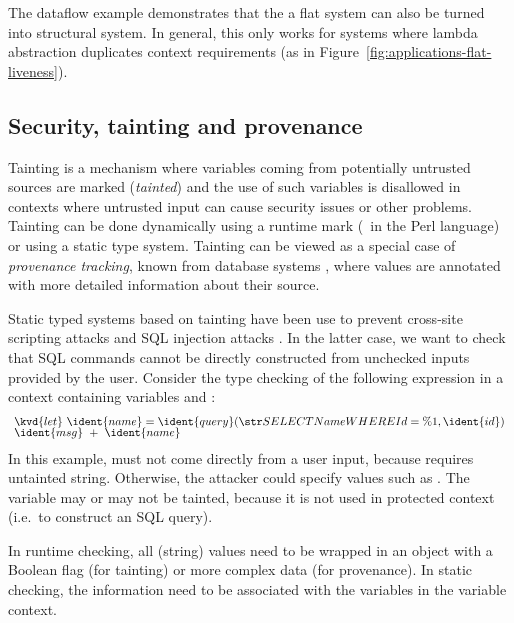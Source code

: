The dataflow example demonstrates that the a flat system can also be turned into structural
system. In general, this only works for systems where lambda abstraction duplicates context
requirements (as in Figure~\ref{fig:applications-flat-liveness}).


\subsection{Security, tainting and provenance}
Tainting is a mechanism where variables coming from potentially untrusted sources are marked
(\emph{tainted}) and the use of such variables is disallowed in contexts where untrusted input
can cause security issues or other problems. Tainting can be done dynamically using a runtime mark
(\eg~in the Perl language) or using a static type system. Tainting can be viewed as a special
case of \emph{provenance tracking}, known from database systems \cite{app-provenance-db}, where
values are annotated with more detailed information about their source.

Static typed systems based on tainting have been use to prevent cross-site scripting attacks
\cite{app-tainting-xss} and SQL injection attacks \cite{app-tainting-sql,app-tainting-wasp}.
In the latter case, we want to check that SQL commands cannot be directly constructed from
unchecked inputs provided by the user. Consider the type checking of the following
expression in a context containing variables  and :
%
\begin{equation*}
\begin{array}{l}
\kvd{let}~\ident{name} = \ident{query}(\str{SELECT Name WHERE Id = \%1}, \ident{id})\\[-0.25em]
\ident{msg}~+~\ident{name}
\end{array}
\end{equation*}
%
In this example,  must not come directly from a user input, because  requires
untainted string. Otherwise, the attacker could specify values such as .
The variable  may or may not be tainted, because it is not used in protected context
(i.e.~to construct an SQL query).

In runtime checking, all (string) values need to be wrapped in an object with a Boolean
flag (for tainting) or more complex data (for provenance). In static checking, the information
need to be associated with the variables in the variable context.

